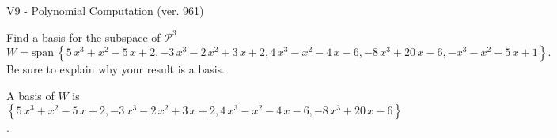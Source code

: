\begin{exercise}
  \begin{exerciseTitle}V9 - Polynomial Computation (ver. 961)\end{exerciseTitle}
  \begin{exerciseStatement}
    Find a basis for the subspace of \(\mathcal{P}^3\) 
\[W=\mathrm{span}\ \left\{5 \, x^{3} + x^{2} - 5 \, x + 2 , -3 \, x^{3} - 2 \, x^{2} + 3 \, x + 2 , 4 \, x^{3} - x^{2} - 4 \, x - 6 , -8 \, x^{3} + 20 \, x - 6 , -x^{3} - x^{2} - 5 \, x + 1\right\}.\]
 Be sure to explain why your result is a basis.


  \end{exerciseStatement}
  \begin{exerciseAnswer}
   A basis of \(W\) is  \(\left\{5 \, x^{3} + x^{2} - 5 \, x + 2 , -3 \, x^{3} - 2 \, x^{2} + 3 \, x + 2 , 4 \, x^{3} - x^{2} - 4 \, x - 6 , -8 \, x^{3} + 20 \, x - 6\right\}\).
  


  \end{exerciseAnswer}
\end{exercise}